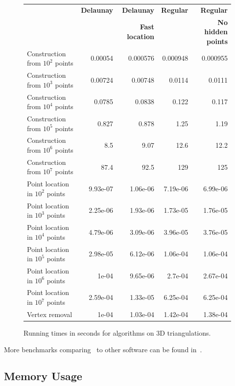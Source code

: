 \begin{figure}[htbp]
\begin{center}
\begin{tabular}{|l||r|r|r|r|}
\hline
& \textbf{Delaunay} & \textbf{Delaunay}      & \textbf{Regular} & \textbf{Regular} \\
&                   & \textbf{Fast location} &                  & \textbf{No hidden points} \\
\hline\hline
Construction from $10^2$ points & 0.00054 & 0.000576 & 0.000948 & 0.000955 \\
Construction from $10^3$ points & 0.00724 & 0.00748  & 0.0114   & 0.0111\\
Construction from $10^4$ points & 0.0785  & 0.0838   & 0.122    & 0.117 \\
Construction from $10^5$ points & 0.827   & 0.878    & 1.25     & 1.19 \\
Construction from $10^6$ points & 8.5     & 9.07     & 12.6     & 12.2 \\
Construction from $10^7$ points & 87.4    & 92.5     & 129      & 125 \\
\hline
Point location in $10^2$ points & 9.93e-07 & 1.06e-06 & 7.19e-06 & 6.99e-06 \\
Point location in $10^3$ points & 2.25e-06 & 1.93e-06 & 1.73e-05 & 1.76e-05 \\
Point location in $10^4$ points & 4.79e-06 & 3.09e-06 & 3.96e-05 & 3.76e-05 \\
Point location in $10^5$ points & 2.98e-05 & 6.12e-06 & 1.06e-04 & 1.06e-04 \\
Point location in $10^6$ points & 1e-04    & 9.65e-06 & 2.7e-04  & 2.67e-04 \\
Point location in $10^7$ points & 2.59e-04 & 1.33e-05 & 6.25e-04 & 6.25e-04 \\
\hline
Vertex removal                  & 1e-04    & 1.03e-04 & 1.42e-04 & 1.38e-04 \\
\hline
\end{tabular}
\end{center}
\caption{Running times in seconds for algorithms on 3D triangulations.
\label{Triangulation3-fig-benchmarks}}
\end{figure}

More benchmarks comparing \cgal\ to other software can be found
in~\cite{msri52:liu-snoeyink-05}.


\subsection{Memory Usage}

